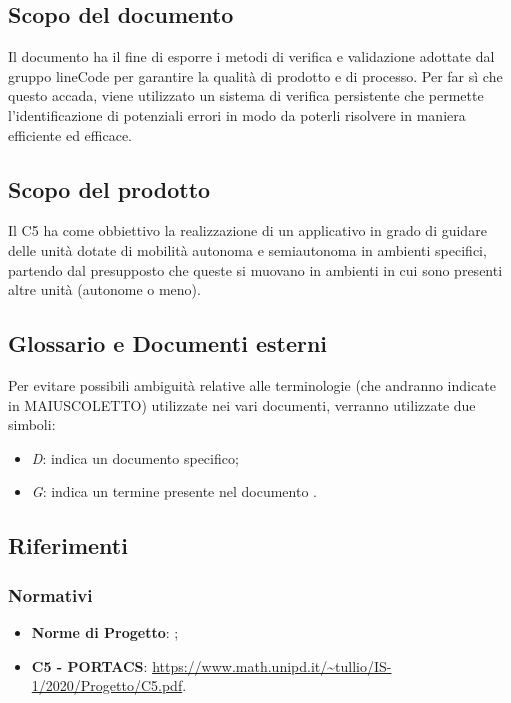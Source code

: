 \subsection{Scopo del documento}
Il documento ha il fine di esporre i metodi di verifica e validazione adottate dal gruppo lineCode per garantire la qualità di prodotto e di processo. Per far sì che questo accada, viene utilizzato un sistema di verifica persistente che permette l'identificazione di potenziali errori in modo da poterli risolvere in maniera efficiente ed efficace.

\subsection{Scopo del prodotto}
Il  C5 ha come obbiettivo la realizzazione di un applicativo  in grado di guidare delle unità dotate di mobilità autonoma e semiautonoma in ambienti specifici, partendo dal presupposto che queste si muovano in ambienti in cui sono presenti altre unità (autonome o meno).

\subsection{Glossario e Documenti esterni}
Per evitare possibili ambiguità relative alle terminologie (che andranno indicate in MAIUSCOLETTO) utilizzate	nei vari documenti, verranno utilizzate due simboli:
\begin{itemize}
	\item \textit{D}: indica un documento specifico;
	\item \textit{G}: indica un termine presente nel documento .
\end{itemize}

\subsection{Riferimenti}

\subsubsection{Normativi}
\begin{itemize}
	\item \textbf{Norme di Progetto}: ;
	\item \textbf{ C5 - PORTACS}:					\url{https://www.math.unipd.it/~tullio/IS-1/2020/Progetto/C5.pdf}.
\end{itemize}


